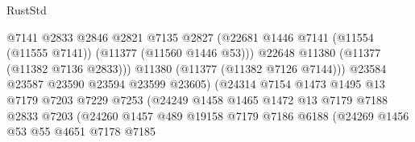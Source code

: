 \begin{lexlean}{RustStd}
\begin{coremodule}
                                          @7141
                                          @2833
                                          @2846
                                          @2821
                                          @7135
                                          @2827
                                          (@22681
                                            @1446
                                            @7141
                                            (@11554 (@11555 @7141))
                                            (@11377 (@11560 @1446 @53)))
                                          @22648
                                          @11380
                                          (@11377 (@11382 @7136 @2833)))
                                        @11380
                                        (@11377 (@11382 @7126 @7144)))
                                      @23584
                                      @23587
                                      @23590
                                      @23594
                                      @23599
                                      @23605)
                                    (@24314
                                      @7154
                                      @1473
                                      @1495
                                      @13
                                      @7179
                                      @7203
                                      @7229
                                      @7253
                                      (@24249
                                        @1458
                                        @1465
                                        @1472
                                        @13
                                        @7179
                                        @7188
                                        @2833
                                        @7203
                                        (@24260
                                          @1457
                                          @489
                                          @19158
                                          @7179
                                          @7186
                                          @6188
                                          (@24269
                                            @1456
                                            @53
                                            @55
                                            @4651
                                            @7178
                                            @7185

\end{coremodule}
\end{lexlean}
